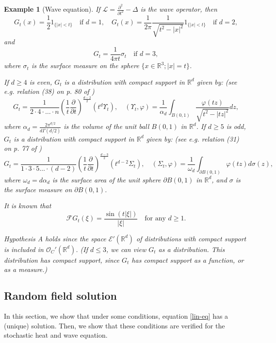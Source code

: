 \documentclass[12pt]{article}
\newtheorem{example}[theorem]{Example}
\def\cE{\mathcal{E}}
\def\cF{\mathcal{F}}
\def\cL{\mathcal{L}}
\def\cO{\mathcal{O}}
\def\bR{\mathbb{R}}
\begin{document}
\begin{example}[Wave equation] If $\cL=\frac{\partial^2}{\partial t^2}-\Delta$ is the wave operator, then
\[
G_t(x)= \frac{1}{2}1_{\{|x| <t\}} \quad \mbox{if \  $d=1$}, \quad 
G_t(x)=\frac{1}{2\pi}\frac{1}{\sqrt{t^2-|x|^2}}1_{\{|x|<t\}} \quad \mbox{if \ $d=2$},
\]
and
\[
G_t=\frac{1}{4\pi t}\sigma_t \quad \mbox{if \ $d=3$},
\]
where $\sigma_t$ is the surface measure on the sphere $\{x \in \bR^3; |x|=t\}$.


If $d \geq 4$ is even, $G_t$ is a distribution with compact support in $\bR^d$ given by: (see e.g. relation (38) on p. 80 of \cite{evans95})
$$G_t= \frac{1}{2 \cdot 4 \cdot \ldots \cdot n} \left(\frac{1}{t}\frac{\partial}{\partial t}
\right)^{\frac{d-2}{2}}(t^d\Upsilon_t), \quad (\Upsilon_t,\varphi)=\frac{1}{\alpha_{d}}\int_{B(0,1)}
\frac{\varphi(tz)}{\sqrt{t^2-|tz|^2}} dz,$$
where $\alpha_{d}=\frac{2\pi^{d/2}}{d\Gamma(d/2)}$ is the volume of the unit ball $B(0,1)$ in $\bR^d$. If
$d \geq 5$ is odd, $G_t$ is a distribution with compact support in $\bR^d$ given by: (see e.g. relation (31) on p. 77 of \cite{evans95})
$$G_t= \frac{1}{1 \cdot 3 \cdot 5 \ldots \cdot (d-2)}\left(\frac{1}{t}\frac{\partial}{\partial t}
 \right)^{\frac{d-3}{2}} (t^{d-2}\Sigma_t), \quad (\Sigma_t,\varphi)=\frac{1}{\omega_d}\int_{\partial B(0,1)}\varphi(tz)d\sigma(z),$$
where $\omega_d=d\alpha_d$ is the surface area of the unit sphere $\partial B(0,1)$ in $\bR^d$, and $\sigma$ is the surface measure on $\partial B(0,1)$.


It is known that
\[
\cF G_t(\xi)=\frac{\sin(t|\xi|)}{|\xi|} \quad \mbox{for any $d\geq 1$}.
\]

Hypothesis A holds since the space $\cE'(\bR^d)$ of distributions with compact support is included in $\cO_{C}'(\bR^d)$. (If $d\le 3$, we can view $G_t$ as a distribution. This distribution has compact support, since $G_t$ has compact support as a function, or as a measure.)


\end{example}




\subsection{Random field solution}


In this section, we show that under some conditions, equation \eqref{lin-eq} has a (unique) solution. Then, we show that these conditions are verified for the stochastic heat and wave equation.
\end{document}
